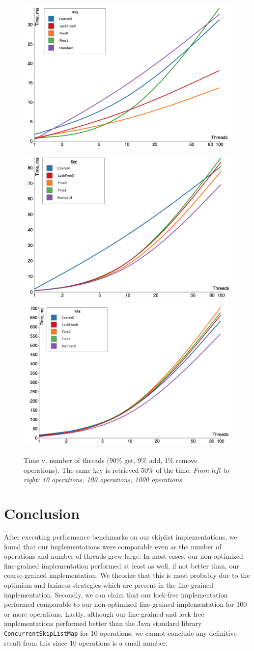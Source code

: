 \documentclass[12pt,oneline,a4paper]{ouparticle}
\begin{document}
\begin{figure}
   \centering
    \hspace*{-2.25cm}
    \includegraphics[width=0.37\linewidth]{10}\hspace{0em}
    \includegraphics[width=0.37\linewidth]{11}\hspace{0em}
    \includegraphics[width=0.37\linewidth]{12}
    \hspace*{-2.25cm}
    \centering
    \caption{Time v. number of threads (90\% get, 9\% add, 1\% remove operations). The same key is retrieved 50\% of the time.\newline{}
    {\it  From left-to-right: 10 operations, 100 operations, 1000 operations.}}
    \label{fig:g4}
\end{figure}

\section{Conclusion}

After executing performance benchmarks on our skiplist implementations, we found that our implementations were comparable even as the number of operations and number of threads grew large. In most cases, our non-optimized fine-grained implementation performed at least as well, if not better than, our coarse-grained implementation. We theorize that this is most probably due to the optimism and laziness strategies which are present in the fine-grained implementation. Secondly, we can claim that our lock-free implementation performed comparable to our non-optimized fine-grained implementation for 100 or more operations. Lastly, although our fine-grained and lock-free implementations performed better than the Java standard library {\tt ConcurrentSkipListMap} for 10 operations, we cannot conclude any definitive result from this since 10 operations is a small number.
\end{document}
